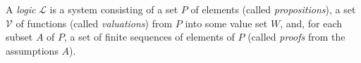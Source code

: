 A \emph{logic} $\mathcal{L}$ is a system consisting of a set $P$ of elements (called \emph{propositions}), a set $\mathcal{V}$ of functions (called \emph{valuations}) from $P$ into some value set $W$, and, for each subset $A$ of $P$, a set of finite sequences of elements of $P$ (called \emph{proofs} from the assumptions $A$).
